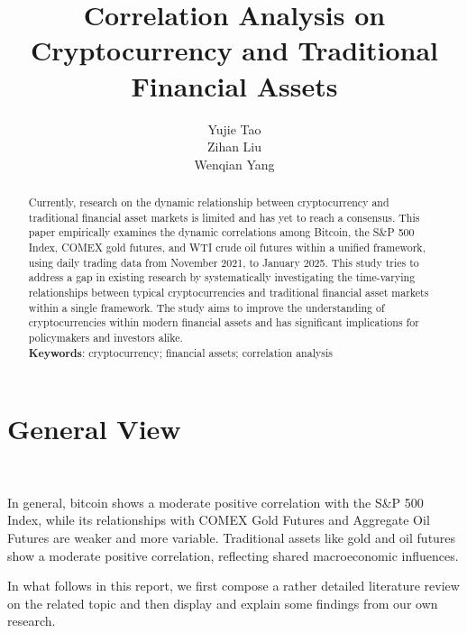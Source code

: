 \documentclass{article}
\title{\textbf{Correlation Analysis on Cryptocurrency and Traditional Financial Assets}}
\author{Yujie Tao
\\Zihan Liu
\\Wenqian Yang}
\begin{document}
\maketitle

\begin{abstract}
Currently, research on the dynamic relationship between cryptocurrency and traditional financial asset markets is limited and has yet to reach a consensus. This paper empirically examines the dynamic correlations among Bitcoin, the S\&P 500 Index, COMEX gold futures, and WTI crude oil futures within a unified framework, using daily trading data from November 2021, to January 2025.
This study tries to address a gap in existing research by systematically investigating the time-varying relationships between typical cryptocurrencies and traditional financial asset markets within a single framework. The study aims to improve the understanding of cryptocurrencies within modern financial assets and has significant implications for policymakers and investors alike.
\\
\textbf{Keywords}: cryptocurrency; financial assets; correlation analysis

\end{abstract}

\section{General View}

\

In general, bitcoin shows a moderate positive correlation with the S\&P 500 Index, while its relationships with COMEX Gold Futures and Aggregate Oil Futures are weaker and more variable. Traditional assets like gold and oil futures show a moderate positive correlation, reflecting shared macroeconomic influences.

In what follows in this report, we first compose a rather detailed literature review on the related topic and then display and explain some findings from our own research.
\end{document}
